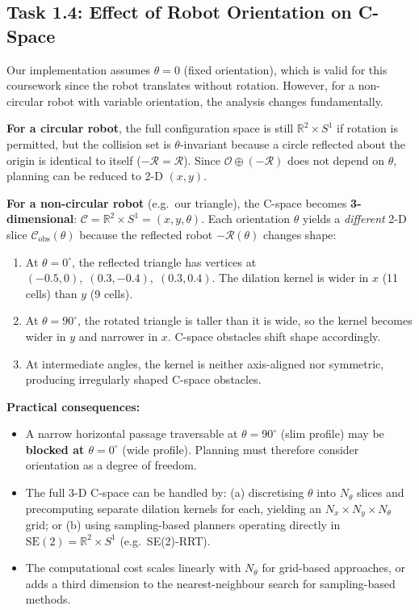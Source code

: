 \documentclass[11pt,a4paper]{article}
\begin{document}
\subsection{Task 1.4: Effect of Robot Orientation on C-Space}

Our implementation assumes $\theta = 0$ (fixed orientation), which is valid for this coursework since the robot translates without rotation. However, for a non-circular robot with variable orientation, the analysis changes fundamentally.

\textbf{For a circular robot}, the full configuration space is still $\mathbb{R}^2 \times S^1$ if rotation is permitted, but the collision set is $\theta$-invariant because a circle reflected about the origin is identical to itself ($-\mathcal{R} = \mathcal{R}$). Since $\mathcal{O} \oplus (-\mathcal{R})$ does not depend on $\theta$, planning can be reduced to 2-D $(x,y)$.

\textbf{For a non-circular robot} (e.g.\ our triangle), the C-space becomes \textbf{3-dimensional}: $\mathcal{C} = \mathbb{R}^2 \times S^1 = (x, y, \theta)$. Each orientation $\theta$ yields a \emph{different} 2-D slice $\mathcal{C}_{\mathrm{obs}}(\theta)$ because the reflected robot $-\mathcal{R}(\theta)$ changes shape:

\begin{enumerate}[nosep]
    \item At $\theta = 0^\circ$, the reflected triangle has vertices at $(-0.5, 0),\; (0.3, -0.4),\; (0.3, 0.4)$. The dilation kernel is wider in $x$ (11 cells) than $y$ (9 cells).
    \item At $\theta = 90^\circ$, the rotated triangle is taller than it is wide, so the kernel becomes wider in $y$ and narrower in $x$. C-space obstacles shift shape accordingly.
    \item At intermediate angles, the kernel is neither axis-aligned nor symmetric, producing irregularly shaped C-space obstacles.
\end{enumerate}

\textbf{Practical consequences:}
\begin{itemize}[nosep]
    \item A narrow horizontal passage traversable at $\theta = 90^\circ$ (slim profile) may be \textbf{blocked at $\theta = 0^\circ$} (wide profile). Planning must therefore consider orientation as a degree of freedom.
    \item The full 3-D C-space can be handled by: (a) discretising $\theta$ into $N_\theta$ slices and precomputing separate dilation kernels for each, yielding an $N_x \times N_y \times N_\theta$ grid; or (b) using sampling-based planners operating directly in $\mathrm{SE}(2) = \mathbb{R}^2 \times S^1$ (e.g.\ SE(2)-RRT).
    \item The computational cost scales linearly with $N_\theta$ for grid-based approaches, or adds a third dimension to the nearest-neighbour search for sampling-based methods.
\end{itemize}
\end{document}
